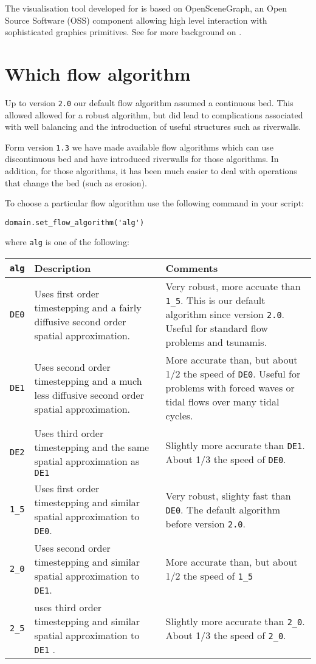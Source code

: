 \documentclass{manual}
\begin{document}
The visualisation tool developed for \anuga is based on
OpenSceneGraph, an Open Source Software (OSS) component allowing high
level interaction with sophisticated graphics primitives.
See \cite{nielsen2005} for more background on \anuga.



\section{Which flow algorithm}
\label{ch:algorithm}

Up to version \verb|2.0| our default flow algorithm assumed  a continuous
bed. This allowed allowed for a robust algorithm, but did lead to complications
associated with well balancing and the introduction of useful structures such as riverwalls.

Form version \verb|1.3| we have made available flow algorithms which can use
discontinuous bed and have introduced riverwalls for those algorithms. In addition,
for those algorithms, it has been much easier to deal with operations that change the bed (such as erosion).

To choose a particular flow algorithm use the following command in your \anuga{} script:
\begin{verbatim}
domain.set_flow_algorithm('alg')
\end{verbatim}
where \verb|alg| is one of the following:
\begin{center}
\begin{tabular}{| l |p{6cm}  |p{6cm}| }
  \hline \hline
  \verb|alg| & Description & Comments \\ \hline
  \verb|DE0| & Uses first order timestepping and a fairly diffusive second order spatial approximation. & Very robust, more accuate than \verb|1_5|. This is our default algorithm since version \verb|2.0|. Useful for standard flow problems and tsunamis. \\ \hline
   \verb|DE1| & Uses second order timestepping and a much less diffusive second order spatial approximation.  &More accurate than, but about 1/2 the speed of \verb|DE0|. Useful for problems with forced waves or tidal flows over many tidal cycles. \\ \hline
   \verb|DE2| & Uses third order timestepping and the same spatial approximation as \verb|DE1| & Slightly more accurate than \verb|DE1|. About 1/3 the speed of \verb|DE0|. \\ \hline
  \hline
  \verb|1_5| &  Uses first order timestepping and similar spatial approximation to \verb|DE0|. & Very  robust, slighty fast than \verb|DE0|. The default algorithm before version \verb|2.0|. \\ \hline
   \verb|2_0| & Uses second order timestepping and similar spatial approximation to \verb|DE1|.  &More accurate than, but  about 1/2 the speed of \verb|1_5| \\ \hline
   \verb|2_5| & uses third order timestepping  and similar spatial approximation to \verb|DE1| . & Slightly more accurate than \verb|2_0|.  About 1/3 the speed of \verb|2_0|.\\    \hline
     \hline
\end{tabular}
\end{center}
\end{document}
